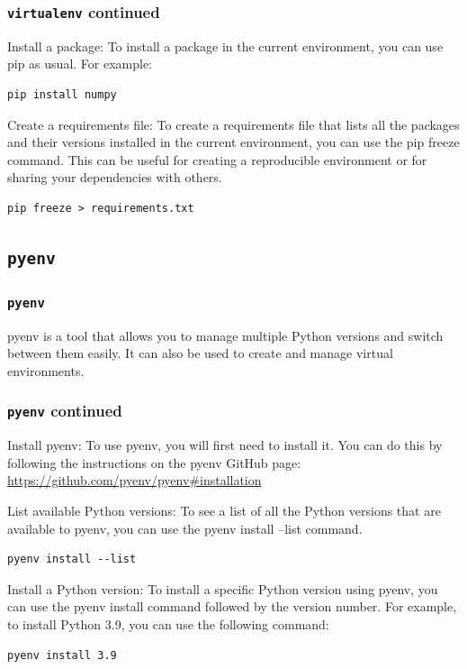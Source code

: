 \documentclass{beamer}
\begin{document}
\begin{frame}[fragile]
  \frametitle{\texttt{virtualenv} continued}

  Install a package: To install a package in the current environment, you can use pip as usual. For example:

  \begin{lstlisting}
pip install numpy
\end{lstlisting}

  Create a requirements file: To create a requirements file that lists all the packages and their versions installed in the current environment, you can use the pip freeze command. This can be useful for creating a reproducible environment or for sharing your dependencies with others.

  \begin{lstlisting}
pip freeze > requirements.txt
\end{lstlisting}

\end{frame}

\subsection{\texttt{pyenv}}

\begin{frame}
  \frametitle{\texttt{pyenv}}

  pyenv is a tool that allows you to manage multiple Python versions and switch between them easily. It can also be used to create and manage virtual environments.

\end{frame}

\begin{frame}[fragile]
  \frametitle{\texttt{pyenv} continued}

  Install pyenv: To use pyenv, you will first need to install it. You can do this by following the instructions on the pyenv GitHub page: \url{https://github.com/pyenv/pyenv#installation}

  List available Python versions: To see a list of all the Python versions that are available to pyenv, you can use the pyenv install --list command.

  \begin{lstlisting}
pyenv install --list
\end{lstlisting}

  Install a Python version: To install a specific Python version using pyenv, you can use the pyenv install command followed by the version number. For example, to install Python 3.9, you can use the following command:

  \begin{lstlisting}
pyenv install 3.9
\end{lstlisting}

\end{frame}
\end{document}
